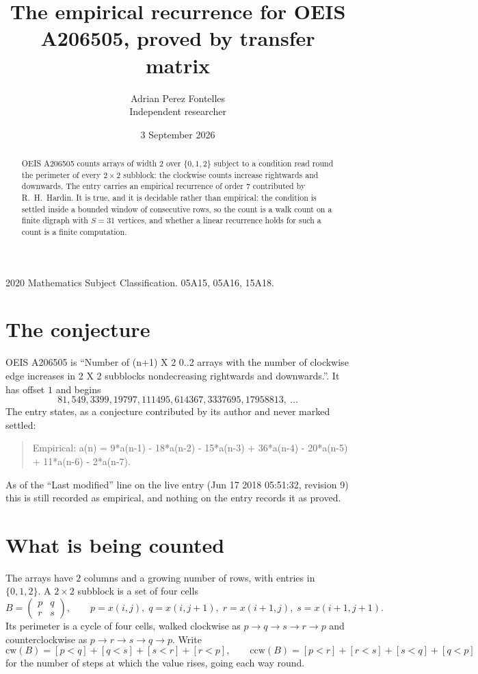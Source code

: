 \documentclass[11pt,a4paper]{article}
\title{The empirical recurrence for OEIS A206505, proved by transfer matrix}
\author{Adrian Perez Fontelles\\ \small Independent researcher}
\date{3 September 2026}
\theoremstyle{plain}
\theoremstyle{definition}
\begin{document}
\maketitle

\begin{abstract}
OEIS A206505 counts arrays of width $2$ over $\{0,1,2\}$ subject to a condition read round the
perimeter of every $2\times2$ subblock: the clockwise counts increase rightwards and downwards. The entry carries an empirical recurrence of
order $7$ contributed by R.~H.~Hardin. It is true, and it is decidable rather than
empirical: the condition is settled inside a bounded window of consecutive rows, so the
count is a walk count on a finite digraph with $S=31$ vertices, and whether a linear
recurrence holds for such a count is a finite computation.
\end{abstract}

\noindent\small 2020 Mathematics Subject Classification. 05A15, 05A16, 15A18.\normalsize

\section{The conjecture}

OEIS A206505 is ``Number of (n+1) X 2 0..2 arrays with the number of clockwise edge increases in 2 X 2 subblocks nondecreasing rightwards and downwards.''. It has offset $1$ and begins
\[
81, 549, 3399, 19797, 111495, 614367, 3337695, 17958813,\ \dots
\]
The entry states, as a conjecture contributed by its author and never marked settled:
\begin{quote}
Empirical: a(n) = 9*a(n-1) - 18*a(n-2) - 15*a(n-3) + 36*a(n-4) - 20*a(n-5) + 11*a(n-6) - 2*a(n-7).
\end{quote}
As of the ``Last modified'' line on the live entry (Jun 17 2018 05:51:32, revision 9) this is still
recorded as empirical, and nothing on the entry records it as proved.

\section{What is being counted}

The arrays have $2$ columns and a growing number of rows, with entries in $\{0,1,2\}$. A
$2\times2$ subblock is a set of four cells
\[
B=\begin{pmatrix} p & q \\ r & s \end{pmatrix},
\qquad p=x(i,j),\; q=x(i,j+1),\; r=x(i+1,j),\; s=x(i+1,j+1).
\]
Its perimeter is a cycle of four cells, walked clockwise as $p\to q\to s\to r\to p$ and
counterclockwise as $p\to r\to s\to q\to p$. Write
\[
\mathrm{cw}(B)=[p<q]+[q<s]+[s<r]+[r<p],\qquad
\mathrm{ccw}(B)=[p<r]+[r<s]+[s<q]+[q<p]
\]
for the number of steps at which the value rises, going each way round.
\end{document}
